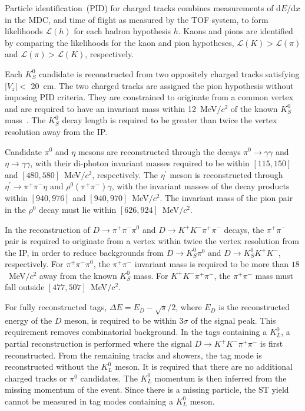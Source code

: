\documentclass[12pt, a4paper, notitlepage, onecolumn]{article}
\begin{document}
Particle identification~(PID) for charged tracks combines measurements of d$E$/d$x$ in the MDC, and time of flight as measured by the TOF system, to form likelihoods $\mathcal{L}(h)$ for each hadron hypothesis $h$. Kaons and pions are identified by comparing the likelihoods for the kaon and pion hypotheses, $\mathcal{L}(K)>\mathcal{L}(\pi)$ and $\mathcal{L}(\pi)>\mathcal{L}(K)$, respectively.

Each $K_{S}^0$ candidate is reconstructed from two oppositely charged tracks satisfying $|V_{z}|<$ 20~cm. The two charged tracks are assigned the pion hypothesis without imposing PID criteria. They are constrained to originate from a common vertex and are required to have an invariant mass within 12~MeV$/c^{2}$ of the known $K^0_{S}$ mass~\cite{pdg}. The $K^0_S$ decay length is required to be greater than twice the vertex resolution away from the IP.

Candidate $\pi^0$ and $\eta$ mesons are reconstructed through the decays $\pi^0\to\gamma\gamma$ and $\eta\to\gamma\gamma$, with their di-photon invariant masses required to be within $[115, 150]$ and $[480, 580]$~MeV$/c^2$, respectively. The $\eta^\prime$ meson is reconstructed through  $\eta^\prime\to\pi^+\pi^-\eta$ and $\rho^0(\pi^+\pi^-)\gamma$, with the invariant masses of the decay products within $[940, 976]$ and $[940, 970]$~MeV$/c^2$. The invariant mass of the pion pair in the $\rho^0$ decay must lie within $[626, 924]$~MeV$/c^2$.

In the reconstruction of $D\to\pi^+\pi^-\pi^0$ and $D\to K^+K^-\pi^+\pi^-$ decays, the $\pi^+\pi^-$ pair is required to originate from a vertex within twice the vertex resolution from the IP, in order to reduce backgrounds from $D\to K_S^0\pi^0$ and $D\to K_S^0K^+K^-$, respectively. For $\pi^+\pi^-\pi^0$, the $\pi^+\pi^-$ invariant mass is required to be more than $18$~MeV$/c^2$ away from the known $K_S^0$ mass. For $K^+K^-\pi^+\pi^-$, the $\pi^+\pi^-$ mass must fall outside $[477, 507]$~MeV$/c^2$.

For fully reconstructed tags, $\Delta E = E_D - \sqrt{s}/2$, where $E_D$ is the reconstructed energy of the $D$ meson, is required to be within $3\sigma$ of the signal peak. This requirement removes combinatorial background. In the tags containing a $K_L^0$, a partial reconstruction is performed where the signal $D\to K^+K^-\pi^+\pi^-$ is first reconstructed. From the remaining tracks and showers, the tag mode is reconstructed without the $K_L^0$ meson. It is required that there are no additional charged tracks or $\pi^0$ candidates. The $K_L^0$ momentum is then inferred from the missing momentum of the event. Since there is a missing particle, the ST yield cannot be measured in tag modes containing a $K_L^0$ meson.
\end{document}
